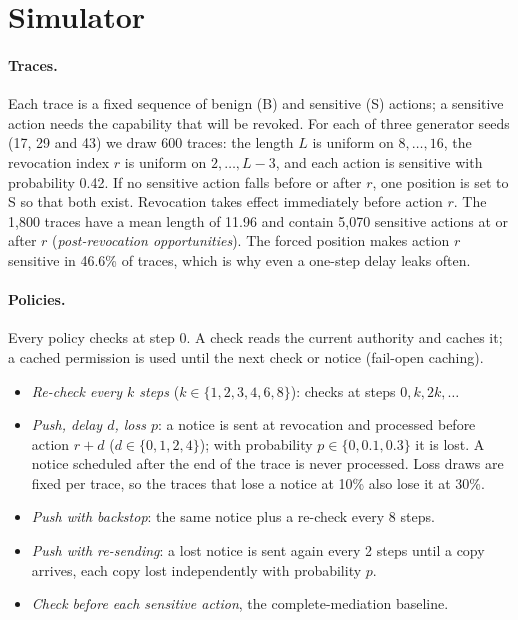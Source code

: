\documentclass[11pt,a4paper]{article}
\begin{document}
\section{Simulator}
\label{sec:sim}

\paragraph{Traces.}
Each trace is a fixed sequence of benign (B) and sensitive (S) actions; a sensitive action needs the capability
that will be revoked. For each of three generator seeds (17, 29 and 43) we draw 600 traces: the length $L$ is
uniform on $8,\dots,16$, the revocation index $r$ is uniform on $2,\dots,L-3$, and each action is sensitive with
probability 0.42. If no sensitive action falls before or after $r$, one position is set to S so that both exist.
Revocation takes effect immediately before action $r$. The 1,800 traces have a mean length of 11.96 and contain
5,070 sensitive actions at or after $r$ (\emph{post-revocation opportunities}). The forced position makes action
$r$ sensitive in 46.6\% of traces, which is why even a one-step delay leaks often.

\paragraph{Policies.}
Every policy checks at step 0. A check reads the current authority and caches it; a cached permission is used
until the next check or notice (fail-open caching).
\begin{itemize}
  \item \emph{Re-check every $k$ steps} ($k \in \{1,2,3,4,6,8\}$): checks at steps $0, k, 2k, \dots$
  \item \emph{Push, delay $d$, loss $p$}: a notice is sent at revocation and processed before action $r+d$
    ($d \in \{0,1,2,4\}$); with probability $p \in \{0, 0.1, 0.3\}$ it is lost. A notice scheduled after the end
    of the trace is never processed. Loss draws are fixed per trace, so the traces that lose a notice at 10\% also
    lose it at 30\%.
  \item \emph{Push with backstop}: the same notice plus a re-check every 8 steps.
  \item \emph{Push with re-sending}: a lost notice is sent again every 2 steps until a copy arrives, each copy
    lost independently with probability $p$.
  \item \emph{Check before each sensitive action}, the complete-mediation baseline.
\end{itemize}
\end{document}
